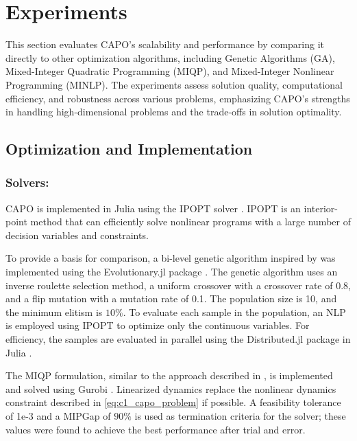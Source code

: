\section{Experiments}\label{sec:capo:experiment}
This section evaluates CAPO's scalability and performance by comparing it directly to other optimization algorithms, including Genetic Algorithms (GA), Mixed-Integer Quadratic Programming (MIQP), and Mixed-Integer Nonlinear Programming (MINLP). The experiments assess solution quality, computational efficiency, and robustness across various problems, emphasizing CAPO's strengths in handling high-dimensional problems and the trade-offs in solution optimality.

\subsection{Optimization and Implementation}
\subsubsection{Solvers:} CAPO is implemented in Julia using the IPOPT solver \cite{Wachter2006}. IPOPT is an interior-point method that can efficiently solve nonlinear programs with a large number of decision variables and constraints.

To provide a basis for comparison, a bi-level genetic algorithm inspired by \cite{bruant2010optimal} was implemented using the Evolutionary.jl package \cite{wildart2022}. The genetic algorithm uses an inverse roulette selection method, a uniform crossover with a crossover rate of 0.8, and a flip mutation with a mutation rate of 0.1. The population size is 10, and the minimum elitism is $10\%$. To evaluate each sample in the population, an NLP is employed using IPOPT to optimize only the continuous variables. For efficiency, the samples are evaluated in parallel using the Distributed.jl package in Julia \cite{bezanson2017julia}.

The MIQP formulation, similar to the approach described in \cite{Chanekar2017}, is implemented and solved using Gurobi \cite{gurobi}. Linearized dynamics replace the nonlinear dynamics constraint described in \eqref{eq:c1_capo_problem} if possible. A feasibility tolerance of 1e-3 and a MIPGap of $90\%$ is used as termination criteria for the solver; these values were found to achieve the best performance after trial and error. 

